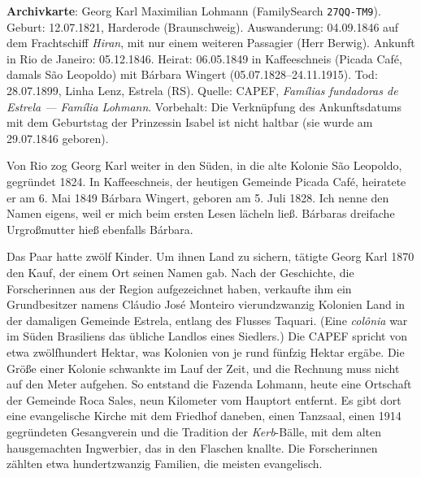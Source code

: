 \documentclass[
  ngerman,
  11pt,
  openany]{book}
\begin{document}
\begin{ficha}

\textbf{Archivkarte}: Georg Karl Maximilian Lohmann (FamilySearch
\texttt{27QQ-TM9}). Geburt: 12.07.1821, Harderode (Braunschweig).
Auswanderung: 04.09.1846 auf dem Frachtschiff \emph{Hiran}, mit nur
einem weiteren Passagier (Herr Berwig). Ankunft in Rio de Janeiro:
05.12.1846. Heirat: 06.05.1849 in Kaffeeschneis (Picada Café, damals São
Leopoldo) mit Bárbara Wingert (05.07.1828--24.11.1915). Tod: 28.07.1899,
Linha Lenz, Estrela (RS). Quelle: CAPEF, \emph{Famílias fundadoras de
Estrela --- Família Lohmann}. Vorbehalt: Die Verknüpfung des
Ankunftsdatums mit dem Geburtstag der Prinzessin Isabel ist nicht
haltbar (sie wurde am 29.07.1846 geboren).

\end{ficha}

Von Rio zog Georg Karl weiter in den Süden, in die alte Kolonie São
Leopoldo, gegründet 1824. In Kaffeeschneis, der heutigen Gemeinde Picada
Café, heiratete er am 6. Mai 1849 Bárbara Wingert, geboren am 5. Juli
1828. Ich nenne den Namen eigens, weil er mich beim ersten Lesen lächeln
ließ. Bárbaras dreifache Urgroßmutter hieß ebenfalls Bárbara.

Das Paar hatte zwölf Kinder. Um ihnen Land zu sichern, tätigte Georg
Karl 1870 den Kauf, der einem Ort seinen Namen gab. Nach der Geschichte,
die Forscherinnen aus der Region aufgezeichnet haben, verkaufte ihm ein
Grundbesitzer namens Cláudio José Monteiro vierundzwanzig Kolonien Land
in der damaligen Gemeinde Estrela, entlang des Flusses Taquari. (Eine
\emph{colônia} war im Süden Brasiliens das übliche Landlos eines
Siedlers.) Die CAPEF spricht von etwa zwölfhundert Hektar, was Kolonien
von je rund fünfzig Hektar ergäbe. Die Größe einer Kolonie schwankte im
Lauf der Zeit, und die Rechnung muss nicht auf den Meter aufgehen. So
entstand die Fazenda Lohmann, heute eine Ortschaft der Gemeinde Roca
Sales, neun Kilometer vom Hauptort entfernt. Es gibt dort eine
evangelische Kirche mit dem Friedhof daneben, einen Tanzsaal, einen 1914
gegründeten Gesangverein und die Tradition der \emph{Kerb}-Bälle, mit
dem alten hausgemachten Ingwerbier, das in den Flaschen knallte. Die
Forscherinnen zählten etwa hundertzwanzig Familien, die meisten
evangelisch.
\end{document}

